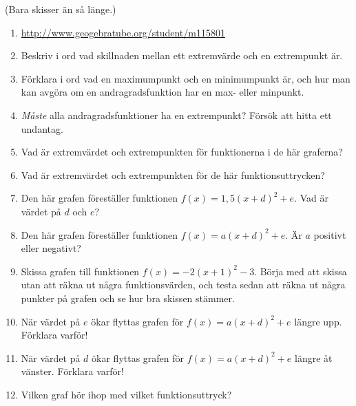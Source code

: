 (Bara skisser än så länge.)

\begin{enumerate}[label=\bfseries Uppgift \thechapter . \arabic*:]
  \item \url{http://www.geogebratube.org/student/m115801}
  \item Beskriv i ord vad skillnaden mellan ett extremvärde och en extrempunkt är.
  \item Förklara i ord vad en maximumpunkt och en minimumpunkt är, och hur man kan avgöra om en andragradsfunktion har en max- eller minpunkt.
  \item \emph{Måste} alla andragradsfunktioner ha en extrempunkt? Försök att hitta ett undantag.
  \item Vad är extremvärdet och extrempunkten för funktionerna i de här graferna?
  \item Vad är extremvärdet och extrempunkten för de här funktionsuttrycken?
  \item Den här grafen föreställer funktionen $f(x)=1{,}5(x+d)^2+e$. Vad är värdet på $d$ och $e$?
  \item Den här grafen föreställer funktionen $f(x)=a(x+d)^2+e$. Är $a$ positivt eller negativt?
  \item Skissa grafen till funktionen $f(x)=-2(x+1)^2-3$.
  Börja med att skissa utan att räkna ut några funktionsvärden, och testa sedan att räkna ut några punkter på grafen och se hur bra skissen stämmer.
  \item När värdet på $e$ ökar flyttas grafen för $f(x)=a(x+d)^2+e$ längre upp. Förklara varför!
  \item När värdet på $d$ ökar flyttas grafen för $f(x)=a(x+d)^2+e$ längre åt vänster. Förklara varför!
  \item Vilken graf hör ihop med vilket funktionsuttryck?

\end{enumerate}
